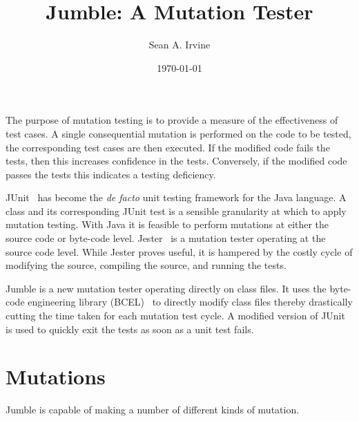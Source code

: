 \documentclass{article}
\title{Jumble: A Mutation Tester}
\author{Sean A. Irvine}
\date{\today}
\begin{document}
\maketitle

The purpose of mutation testing is to provide a measure of the effectiveness of test cases. A single consequential mutation is performed on the code to be tested, the corresponding test cases are then executed. If the modified code fails the tests, then this increases confidence in the tests. Conversely, if the modified code passes the tests this indicates a testing deficiency.

JUnit~\cite{junit} has become the {\em de facto\/} unit testing framework for the Java language. A class and its corresponding JUnit test is a sensible granularity at which to apply mutation testing. With Java it is feasible to perform mutations at either the source code or byte-code level. Jester~\cite{jester} is a mutation tester operating at the source code level. While Jester proves useful, it is hampered by the costly cycle of modifying the source, compiling the source, and running the tests.

Jumble is a new mutation tester operating directly on class files. It uses the byte-code engineering library (BCEL)~\cite{bcel} to directly modify class files thereby drastically cutting the time taken for each mutation test cycle. A modified version of JUnit is used to quickly exit the tests as soon as a unit test fails.

\section{Mutations}

Jumble is capable of making a number of different kinds of mutation.
\end{document}
